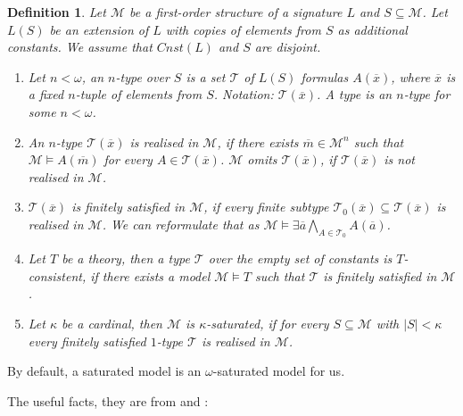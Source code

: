 \documentclass[a4paper]{article}
\theoremstyle{defin}
\newtheorem{definition}{Definition}
\theoremstyle{theorem}
\theoremstyle{claim}
\theoremstyle{prop}
\theoremstyle{lemma}
\theoremstyle{fact}
\theoremstyle{ex}
\theoremstyle{col}
\begin{document}
\begin{definition} Let $\mathcal{M}$ be a first-order structure of a signature $L$ and $S \subseteq \mathcal{M}$. Let $L(S)$ be an extension of $L$ with copies of elements from $S$ as additional constants. We assume that $Cnst(L)$ and $S$ are disjoint.

\begin{enumerate}
\item Let $n < \omega$, an $n$-type over $S$ is a set $\mathcal{T}$ of $L(S)$ formulas $A(\overline{x})$, where $\overline{x}$ is a fixed $n$-tuple of elements from $S$. Notation: $\mathcal{T}(\overline{x})$. A type is an $n$-type for some $n < \omega$.
\item An $n$-type $\mathcal{T}(\overline{x})$ is realised in $\mathcal{M}$, if there exists $\overline{m} \in \mathcal{M}^n$ such that $\mathcal{M} \models A(\overline{m})$ for every $A \in \mathcal{T}(\overline{x})$. $\mathcal{M}$ omits $\mathcal{T}(\overline{x})$, if $\mathcal{T}(\overline{x})$ is not realised in $\mathcal{M}$.
\item $\mathcal{T}(\overline{x})$ is finitely satisfied in $\mathcal{M}$, if every finite subtype $\mathcal{T}_0(\overline{x}) \subseteq \mathcal{T}(\overline{x})$ is realised in $\mathcal{M}$. We can reformulate that as $\mathcal{M} \models \exists \overline{a} \bigwedge \limits_{A \in \mathcal{T}_0} A(\overline{a})$.
\item Let $T$ be a theory, then a type $\mathcal{T}$ over the empty set of constants is $T$-consistent, if there exists a model $\mathcal{M} \models T$ such that $\mathcal{T}$ is finitely satisfied in $\mathcal{M}$.
\item Let $\kappa$ be a cardinal, then $\mathcal{M}$ is $\kappa$-saturated, if for every $S \subseteq \mathcal{M}$ with $|S| < \kappa$ every finitely satisfied $1$-type $\mathcal{T}$ is realised in $\mathcal{M}$.
\end{enumerate}
\end{definition}

By default, a saturated model is an $\omega$-saturated model for us.

The useful facts, they are from \cite{chang1990model} and \cite{hodges1993model}:
\end{document}
